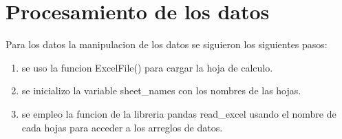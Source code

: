 
\section{Procesamiento de los datos}

\begin{flushleft}
    Para los datos la manipulacion de los datos se siguieron los siguientes pasos:
\end{flushleft}

\begin{enumerate}
    \item se uso la funcion ExcelFile() para cargar la hoja de calculo.
    \item se inicializo la variable sheet\_names con los nombres de las hojas.
    \item se empleo la funcion de la libreria pandas read\_excel usando el nombre de cada hojas para acceder a los arreglos de datos.
\end{enumerate}
